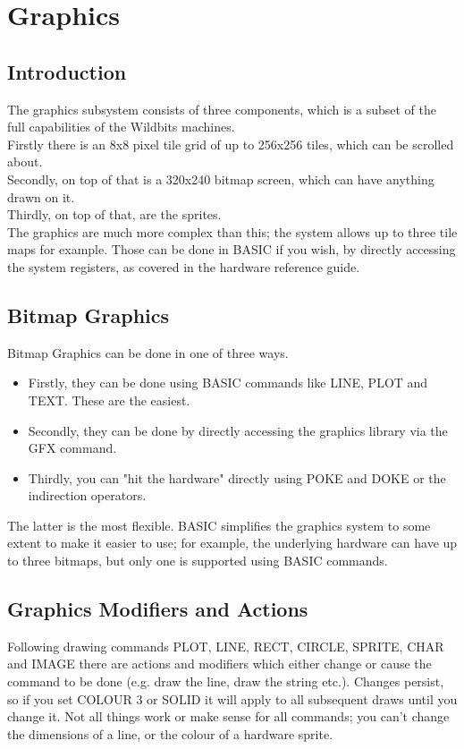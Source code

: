 \chapter{Graphics}
\label{chap:graphics}

\section{Introduction}

The graphics subsystem consists of three components, which is a subset of the full capabilities of the Wildbits machines.\\

Firstly there is an 8x8 pixel tile grid of up to 256x256 tiles, which can be scrolled about.\\

Secondly, on top of that is a 320x240 bitmap screen, which can have anything drawn on it.\\

Thirdly, on top of that, are the sprites.\\

The graphics are much more complex than this; the system allows up to three tile maps for example. Those can be done in BASIC if you wish, by directly accessing the system registers, as covered in the hardware reference guide.\\

\section{Bitmap Graphics}

Bitmap Graphics can be done in one of three ways.

\begin{itemize}
\item Firstly, they can be done using BASIC commands like LINE, PLOT and TEXT. These are the easiest.
\item Secondly, they can be done by directly accessing the graphics library via the GFX command.
\item Thirdly, you can "hit the hardware" directly using POKE and DOKE or the indirection operators.
\end{itemize}
The latter is the most flexible. BASIC simplifies the graphics system to some extent to make it easier to use; for example, the underlying hardware can have up to three bitmaps, but only one is supported using BASIC commands.

\section{Graphics Modifiers and Actions}
Following drawing commands PLOT, LINE, RECT, CIRCLE, SPRITE, CHAR and IMAGE there are actions and modifiers which either change or cause the command to be done (e.g. draw the line, draw the string etc.).
Changes persist, so if you set COLOUR 3 or SOLID it will apply to all subsequent draws until you change it.
Not all things work or make sense for all commands; you can’t change the dimensions of a line, or the colour of a hardware sprite.


